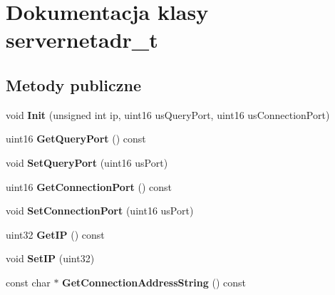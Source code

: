 \hypertarget{classservernetadr__t}{}\section{Dokumentacja klasy servernetadr\+\_\+t}
\label{classservernetadr__t}
\subsection*{Metody publiczne}
\begin{DoxyCompactItemize}
\item 
\mbox{\label{classservernetadr__t_a008b393457dc2ef8d10dce67db5cf12a}} 
void {\bfseries Init} (unsigned int ip, uint16 us\+Query\+Port, uint16 us\+Connection\+Port)
\item 
\mbox{\label{classservernetadr__t_a0d5935620c85f896c09526c97dcc7809}} 
uint16 {\bfseries Get\+Query\+Port} () const
\item 
\mbox{\label{classservernetadr__t_a07ffb7a94843f3cf7f168fc55f5f3fed}} 
void {\bfseries Set\+Query\+Port} (uint16 us\+Port)
\item 
\mbox{\label{classservernetadr__t_ad20e4ed6df2e83fdae615e7ba111980d}} 
uint16 {\bfseries Get\+Connection\+Port} () const
\item 
\mbox{\label{classservernetadr__t_af228deefd75f58e0f83f3558053a2c97}} 
void {\bfseries Set\+Connection\+Port} (uint16 us\+Port)
\item 
\mbox{\label{classservernetadr__t_a129921818861d0de2d4b69cfa4336d56}} 
uint32 {\bfseries Get\+IP} () const
\item 
\mbox{\label{classservernetadr__t_aaf40e8505a6ff055247056833d33708c}} 
void {\bfseries Set\+IP} (uint32)
\item 
\mbox{\label{classservernetadr__t_abe4506c8b567e2c7239ab6b910bdc991}} 
const char $\ast$ {\bfseries Get\+Connection\+Address\+String} () const
\item 
\mbox{\label{classservernetadr__t_a63669b96c5ad1cbcfb03176145aab136}} 

\end{DoxyCompactItemize}
